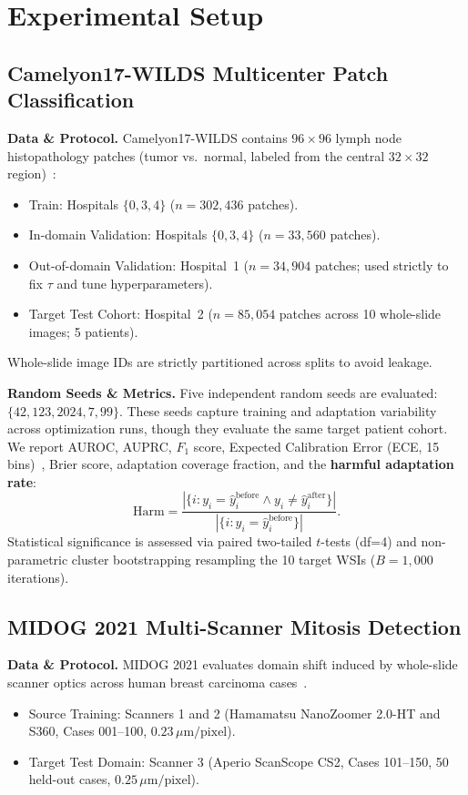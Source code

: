 \documentclass[conference]{IEEEtran}
\begin{document}
\section{Experimental Setup}

\subsection{Camelyon17-WILDS Multicenter Patch Classification}
\textbf{Data \& Protocol.}
Camelyon17-WILDS contains $96 \times 96$ lymph node histopathology patches (tumor vs.\ normal, labeled from the central $32 \times 32$ region)~\cite{koh2021wilds,bandi2018camelyon17}:
\begin{itemize}
\item Train: Hospitals $\{0, 3, 4\}$ ($n=302{,}436$ patches).
\item In-domain Validation: Hospitals $\{0, 3, 4\}$ ($n=33{,}560$ patches).
\item Out-of-domain Validation: Hospital~1 ($n=34{,}904$ patches; used strictly to fix $\tau$ and tune hyperparameters).
\item Target Test Cohort: Hospital~2 ($n=85{,}054$ patches across 10 whole-slide images; 5 patients).
\end{itemize}
Whole-slide image IDs are strictly partitioned across splits to avoid leakage.

\textbf{Random Seeds \& Metrics.}
Five independent random seeds are evaluated: $\{42, 123, 2024, 7, 99\}$.
These seeds capture training and adaptation variability across optimization runs, though they evaluate the same target patient cohort.
We report AUROC, AUPRC, $F_1$ score, Expected Calibration Error (ECE, 15 bins)~\cite{guo2017calibration}, Brier score, adaptation coverage fraction, and the \textbf{harmful adaptation rate}:
\begin{equation}
\mathrm{Harm} = \frac{|\{i : y_i = \hat{y}_i^{\mathrm{before}} \land y_i \ne \hat{y}_i^{\mathrm{after}}\}|}{|\{i : y_i = \hat{y}_i^{\mathrm{before}}\}|}.
\end{equation}
Statistical significance is assessed via paired two-tailed $t$-tests (df=4) and non-parametric cluster bootstrapping resampling the 10 target WSIs ($B=1{,}000$ iterations).

\subsection{MIDOG 2021 Multi-Scanner Mitosis Detection}
\textbf{Data \& Protocol.}
MIDOG 2021 evaluates domain shift induced by whole-slide scanner optics across human breast carcinoma cases~\cite{aubreville2023mitosis}.
\begin{itemize}
\item Source Training: Scanners 1 and 2 (Hamamatsu NanoZoomer 2.0-HT and S360, Cases 001--100, $0.23\,\mu\text{m/pixel}$).
\item Target Test Domain: Scanner 3 (Aperio ScanScope CS2, Cases 101--150, 50 held-out cases, $0.25\,\mu\text{m/pixel}$).
\end{itemize}
\end{document}
